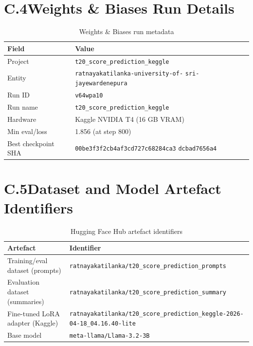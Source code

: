 \section*{C.4\quad Weights \& Biases Run Details}

\begin{table}[ht]
\centering
\caption{Weights \& Biases run metadata}
\label{tab:wandb_run}
\begin{tabular}{lp{9cm}}
\hline
\textbf{Field} & \textbf{Value} \\
\hline
Project           & \texttt{t20\_score\_prediction\_keggle} \\
Entity            & \texttt{ratnayakatilanka-university-of-} \texttt{sri-jayewardenepura} \\
Run ID            & \texttt{v64wpa10} \\
Run name          & \texttt{t20\_score\_prediction\_keggle} \\
Hardware          & Kaggle NVIDIA T4 (16 GB VRAM) \\
Min eval/loss     & 1.856 (at step 800) \\
Best checkpoint SHA & \texttt{00be3f3f2cb4af3cd727c68284ca3} \texttt{dcbad7656a4} \\
\hline
\end{tabular}
\end{table}

\section*{C.5\quad Dataset and Model Artefact Identifiers}

\begin{table}[ht]
\centering
\caption{Hugging Face Hub artefact identifiers}
\label{tab:hf_artefacts}
\small
\begin{tabular}{@{}p{4.5cm}p{10cm}@{}}
\hline
\textbf{Artefact} & \textbf{Identifier} \\
\hline
Training/eval dataset (prompts)  & \texttt{ratnayakatilanka/}\newline\texttt{t20\_score\_prediction\_prompts} \\
Evaluation dataset (summaries)   & \texttt{ratnayakatilanka/}\newline\texttt{t20\_score\_prediction\_summary} \\
Fine-tuned LoRA adapter (Kaggle) & \texttt{ratnayakatilanka/t20\_score\_prediction\_keggle-}\newline\texttt{2026-04-18\_04.16.40-lite} \\
Base model                       & \texttt{meta-llama/Llama-3.2-3B} \\
\hline
\end{tabular}
\end{table}

